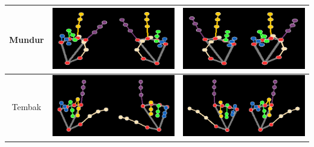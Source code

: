 \documentclass[conference]{IEEEtran}
\begin{document}
\begin{table}[H]
\begin{tabular}{|c|c|c|}
    Mundur & \includegraphics[width=0.3\linewidth]{../Gambar/Mundur (1).png} & \includegraphics[width=0.3\linewidth]{../Gambar/MundurI (1).png} \\ \hline
    Tembak & \includegraphics[width=0.3\linewidth]{../Gambar/Tembak (1).png} & \includegraphics[width=0.3\linewidth]{../Gambar/TembakI (1).png} \\ \hline
    \end{tabular}
  \end{table}
\end{document}
